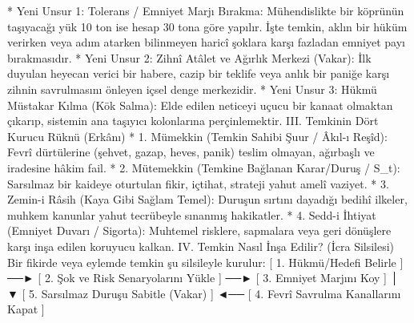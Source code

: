 \documentclass[11pt,a4paper]{article}
\begin{document}
 * Yeni Unsur 1: Tolerans / Emniyet Marjı Bırakma:
   Mühendislikte bir köprünün taşıyacağı yük 10 ton ise hesap 30 tona göre yapılır. İşte temkin, aklın bir hüküm verirken veya adım atarken bilinmeyen haricî şoklara karşı fazladan emniyet payı bırakmasıdır.
 * Yeni Unsur 2: Zihnî Atâlet ve Ağırlık Merkezi (Vakar):
   İlk duyulan heyecan verici bir habere, cazip bir teklife veya anlık bir paniğe karşı zihnin savrulmasını önleyen içsel denge merkezidir.
 * Yeni Unsur 3: Hükmü Müstakar Kılma (Kök Salma):
   Elde edilen neticeyi uçucu bir kanaat olmaktan çıkarıp, sistemin ana taşıyıcı kolonlarına perçinlemektir.
III. Temkinin Dört Kurucu Rüknü (Erkânı)
 * 1. Mümekkin (Temkin Sahibi Şuur / Âkıl-ı Reşîd): Fevrî dürtülerine (şehvet, gazap, heves, panik) teslim olmayan, ağırbaşlı ve iradesine hâkim fail.
 * 2. Mütemekkin (Temkine Bağlanan Karar/Duruş / S_t): Sarsılmaz bir kaideye oturtulan fikir, içtihat, strateji yahut amelî vaziyet.
 * 3. Zemin-i Râsih (Kaya Gibi Sağlam Temel): Duruşun sırtını dayadığı bedihî ilkeler, muhkem kanunlar yahut tecrübeyle sınanmış hakikatler.
 * 4. Sedd-i İhtiyat (Emniyet Duvarı / Sigorta): Muhtemel risklere, sapmalara veya geri dönüşlere karşı inşa edilen koruyucu kalkan.
IV. Temkin Nasıl İnşa Edilir? (İcra Silsilesi)
Bir fikirde veya eylemde temkin şu silsileyle kurulur:
[ 1. Hükmü/Hedefi Belirle ] ──► [ 2. Şok ve Risk Senaryolarını Yükle ] ──► [ 3. Emniyet Marjını Koy ]
                                                                                   │
                                                                                   ▼
[ 5. Sarsılmaz Duruşu Sabitle (Vakar) ] ◄── [ 4. Fevrî Savrulma Kanallarını Kapat ]
\end{document}
